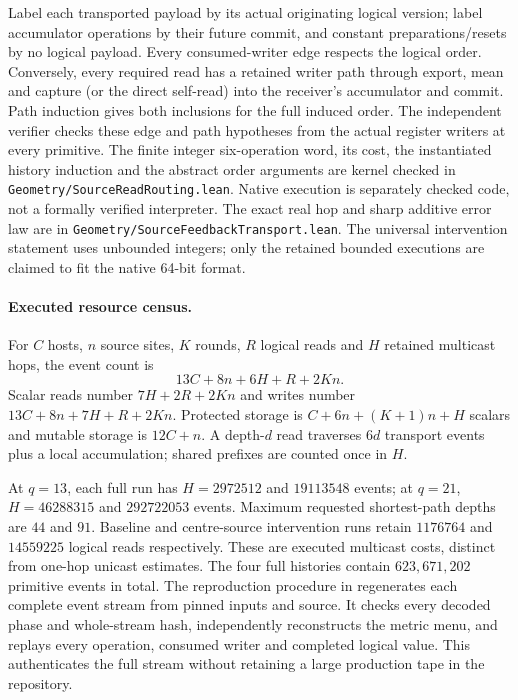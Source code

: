 Label each transported payload by its actual originating logical version;
label accumulator operations by their future commit, and constant
preparations/resets by no logical payload.  Every consumed-writer edge
respects the logical order.  Conversely, every required read has a retained
writer path through export, mean and capture (or the direct self-read) into
the receiver's accumulator and commit.  Path induction gives both
inclusions for the full induced order.  The independent verifier checks
these edge and path hypotheses from the actual register writers at every
primitive. The finite integer six-operation word, its cost, the instantiated
history induction and the abstract order arguments are kernel checked in
\texttt{Geometry/SourceReadRouting.lean}. Native execution is separately
checked code, not a formally verified interpreter. The exact real hop and sharp
additive error law are in \texttt{Geometry/SourceFeedbackTransport.lean}.
The universal intervention statement uses unbounded integers; only the
retained bounded executions are claimed to fit the native 64-bit format.

\paragraph{Executed resource census.}
For $C$ hosts, $n$ source sites, $K$ rounds, $R$ logical reads and $H$ retained
multicast hops, the event count is
\[
  13C+8n+6H+R+2Kn.
\]
Scalar reads number $7H+2R+2Kn$ and writes number
$13C+8n+7H+R+2Kn$.  Protected storage is
$C+6n+(K+1)n+H$ scalars and mutable storage is $12C+n$.
A depth-$d$ read traverses $6d$ transport events plus a local accumulation;
shared prefixes are counted once in $H$.

At $q=13$, each full run has $H=2972512$ and $19113548$ events; at $q=21$,
$H=46288315$ and $292722053$ events.  Maximum requested shortest-path depths
are $44$ and $91$.  Baseline and centre-source intervention runs retain
$1176764$ and $14559225$ logical reads respectively.  These are executed
multicast costs, distinct from one-hop unicast estimates. The four full
histories contain $623{,}671{,}202$ primitive events in total. The
reproduction procedure in  regenerates each
complete event stream from pinned inputs and source. It checks every
decoded phase and whole-stream hash, independently reconstructs the metric
menu, and replays every operation, consumed writer and completed logical
value. This authenticates the full stream without retaining a large
production tape in the repository.

